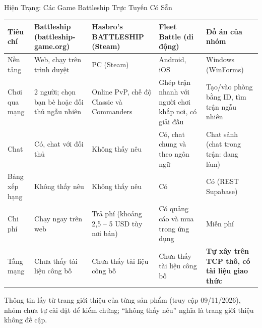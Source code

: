 \begin{frame}[label=hientrang]{Hiện Trạng: Các Game Battleship Trực Tuyến Có Sẵn}
  \scriptsize
  \begin{tabularx}{\textwidth}{@{}l Y Y Y Y@{}}
    \toprule
    \textbf{Tiêu chí} & \textbf{Battleship (battleship-game.org) \cite{ref9}} & \textbf{Hasbro's BATTLESHIP (Steam) \cite{ref10}} & \textbf{Fleet Battle (di động) \cite{ref11}} & \textbf{Đồ án của nhóm} \\
    \midrule
    Nền tảng & Web, chạy trên trình duyệt & PC (Steam) & Android, iOS & Windows (WinForms) \\
    Chơi qua mạng & 2 người; chọn bạn bè hoặc đối thủ ngẫu nhiên & Online PvP, chế độ Classic và Commanders & Ghép trận nhanh với người chơi khắp nơi, có giải đấu & Tạo/vào phòng bằng ID, tìm trận ngẫu nhiên \\
    Chat & Có, chat với đối thủ & Không thấy nêu & Có, chat chung và theo ngôn ngữ & Chat sảnh (chat trong trận: đang làm) \\
    Bảng xếp hạng & Không thấy nêu & Không thấy nêu & Có & Có (REST Supabase) \\
    Chi phí & Chạy ngay trên web & Trả phí (khoảng 2,5 -- 5 USD tùy nơi bán) & Có quảng cáo và mua trong ứng dụng & Miễn phí \\
    Tầng mạng & Chưa thấy tài liệu công bố & Chưa thấy tài liệu công bố & Chưa thấy tài liệu công bố & \textbf{Tự xây trên TCP thô, có tài liệu giao thức} \\
    \bottomrule
  \end{tabularx}
  \vspace{0.15cm}

  \tiny Thông tin lấy từ trang giới thiệu của từng sản phẩm (truy cập 09/11/2026), nhóm chưa tự cài đặt để kiểm chứng; ``không thấy nêu'' nghĩa là trang giới thiệu không đề cập.
\end{frame}

